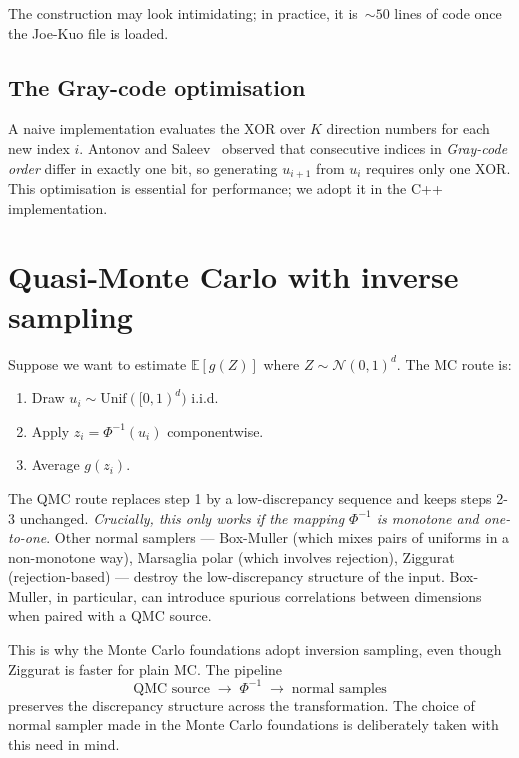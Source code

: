 \documentclass[11pt,a4paper]{article}
\theoremstyle{plain}
\theoremstyle{definition}
\theoremstyle{remark}
\newcommand{\E}{\mathbb{E}}
\begin{document}
The construction may look intimidating; in practice, it is~$\sim 50$
lines of code once the Joe-Kuo file is loaded.

\subsection{The Gray-code optimisation}

A naive implementation evaluates the XOR over $K$ direction numbers
for each new index $i$. Antonov and Saleev~\cite{AntonovSaleev1979}
observed that consecutive indices in
\emph{Gray-code order} differ in exactly one bit, so generating
$u_{i+1}$ from $u_i$ requires only one XOR. This optimisation is
essential for performance; we adopt it in the C++ implementation.

\section{Quasi-Monte Carlo with inverse sampling}
\label{sec:qmc-inversion}

Suppose we want to estimate $\E[g(Z)]$ where $Z \sim \mathcal{N}(0,
1)^d$. The MC route is:
\begin{enumerate}
\item Draw $u_i \sim \mathrm{Unif}([0,1)^d)$ i.i.d.
\item Apply $z_i = \Phi^{-1}(u_i)$ componentwise.
\item Average $g(z_i)$.
\end{enumerate}
The QMC route replaces step 1 by a low-discrepancy sequence and
keeps steps 2-3 unchanged. \emph{Crucially, this only works if the
mapping $\Phi^{-1}$ is monotone and one-to-one}. Other normal
samplers --- Box-Muller (which mixes pairs of uniforms in a
non-monotone way), Marsaglia polar (which involves rejection),
Ziggurat (rejection-based) --- destroy the low-discrepancy structure
of the input. Box-Muller, in particular, can introduce spurious
correlations between dimensions when paired with a QMC source.

This is why the Monte Carlo foundations adopt inversion sampling,
even though Ziggurat is faster for plain MC. The pipeline
\begin{equation}
\text{QMC source} \;\longrightarrow\; \Phi^{-1}
\;\longrightarrow\; \text{normal samples}
\end{equation}
preserves the discrepancy structure across the transformation. The
choice of normal sampler made in the Monte Carlo foundations is
deliberately taken with this need in mind.
\end{document}

